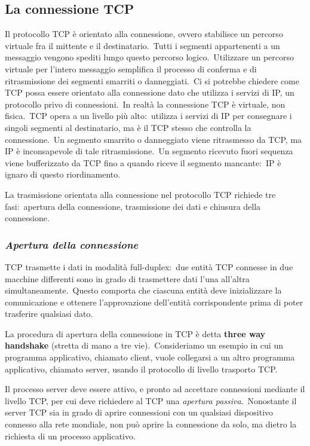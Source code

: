 \subsection{La connessione TCP}

Il protocollo TCP è orientato alla connessione, ovvero stabilisce un percorso virtuale fra il mittente e il destinatario.\
Tutti i segmenti appartenenti a un messaggio vengono spediti lungo questo percorso logico.\
Utilizzare un percorso virtuale per l'intero messaggio semplifica il processo di conferma e di ritrasmissione dei segmenti smarriti o danneggiati.\
Ci si potrebbe chiedere come TCP possa essere orientato alla connessione dato che utilizza i servizi di IP, un protocollo privo di connessioni.\
In realtà la connessione TCP è virtuale, non fisica.\
TCP opera a un livello più alto:\ utilizza i servizi di IP per consegnare i singoli segmenti al destinatario, ma è il TCP stesso che controlla la connessione.\
Un segmento smarrito o danneggiato viene ritrasmesso da TCP, ma IP è inconsapevole di tale ritrasmissione.\
Un segmento ricevuto fuori sequenza viene bufferizzato da TCP fino a quando riceve il segmento mancante:\ IP è ignaro di questo riordinamento.

La trasmissione orientata alla connessione nel protocollo TCP richiede tre fasi:\ apertura della connessione, trasmissione dei dati e chiusura della connessione.

\subsubsection{\emph{Apertura della connessione}}

TCP trasmette i dati in modalità full-duplex:\ due entità TCP connesse in due macchine differenti sono in grado di trasmettere dati l'una all'altra simultaneamente.\
Questo comporta che ciascuna entità deve inizializzare la comunicazione e ottenere l'approvazione dell'entità corrispondente prima di poter trasferire qualsiasi dato.

La procedura di apertura della connessione in TCP è detta \textbf{three way handshake} (stretta di mano a tre vie).\
Consideriamo un esempio in cui un programma applicativo, chiamato client, vuole collegarsi a un altro programma applicativo, chiamato server, usando il protocollo di livello trasporto TCP.

Il processo server deve essere attivo, e pronto ad accettare connessioni mediante il livello TCP, per cui deve richiedere al TCP una \emph{apertura passiva}.\
Nonostante il server TCP sia in grado di aprire connessioni con un qualsiasi dispositivo connesso alla rete mondiale, non può aprire la connessione da solo, ma dietro la richiesta di un processo applicativo.

